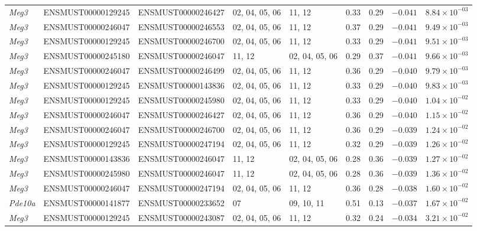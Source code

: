 \begin{landscape}
\begin{longtable}{@{} l l l p{2.8cm} p{2.8cm} r r r r @{}}
\textit{Meg3}   & ENSMUST00000129245 & ENSMUST00000246427 & 02, 04, 05, 06 & 11, 12 & 0.33 & 0.29 & $-0.041$ & $8.84 \times 10^{-03}$ \\
\textit{Meg3}   & ENSMUST00000246047 & ENSMUST00000246553 & 02, 04, 05, 06 & 11, 12 & 0.37 & 0.29 & $-0.041$ & $9.49 \times 10^{-03}$ \\
\textit{Meg3}   & ENSMUST00000129245 & ENSMUST00000246700 & 02, 04, 05, 06 & 11, 12 & 0.33 & 0.29 & $-0.041$ & $9.51 \times 10^{-03}$ \\
\textit{Meg3}   & ENSMUST00000245180 & ENSMUST00000246047 & 11, 12 & 02, 04, 05, 06 & 0.29 & 0.37 & $-0.041$ & $9.66 \times 10^{-03}$ \\
\textit{Meg3}   & ENSMUST00000246047 & ENSMUST00000246499 & 02, 04, 05, 06 & 11, 12 & 0.36 & 0.29 & $-0.040$ & $9.79 \times 10^{-03}$ \\
\textit{Meg3}   & ENSMUST00000129245 & ENSMUST00000143836 & 02, 04, 05, 06 & 11, 12 & 0.33 & 0.29 & $-0.040$ & $9.83 \times 10^{-03}$ \\
\textit{Meg3}   & ENSMUST00000129245 & ENSMUST00000245980 & 02, 04, 05, 06 & 11, 12 & 0.33 & 0.29 & $-0.040$ & $1.04 \times 10^{-02}$ \\
\textit{Meg3}   & ENSMUST00000246047 & ENSMUST00000246427 & 02, 04, 05, 06 & 11, 12 & 0.36 & 0.29 & $-0.040$ & $1.15 \times 10^{-02}$ \\
\textit{Meg3}   & ENSMUST00000246047 & ENSMUST00000246700 & 02, 04, 05, 06 & 11, 12 & 0.36 & 0.29 & $-0.039$ & $1.24 \times 10^{-02}$ \\
\textit{Meg3}   & ENSMUST00000129245 & ENSMUST00000247194 & 02, 04, 05, 06 & 11, 12 & 0.32 & 0.29 & $-0.039$ & $1.26 \times 10^{-02}$ \\
\textit{Meg3}   & ENSMUST00000143836 & ENSMUST00000246047 & 11, 12 & 02, 04, 05, 06 & 0.28 & 0.36 & $-0.039$ & $1.27 \times 10^{-02}$ \\
\textit{Meg3}   & ENSMUST00000245980 & ENSMUST00000246047 & 11, 12 & 02, 04, 05, 06 & 0.28 & 0.36 & $-0.039$ & $1.36 \times 10^{-02}$ \\
\textit{Meg3}   & ENSMUST00000246047 & ENSMUST00000247194 & 02, 04, 05, 06 & 11, 12 & 0.36 & 0.28 & $-0.038$ & $1.60 \times 10^{-02}$ \\
\textit{Pde10a} & ENSMUST00000141877 & ENSMUST00000233652 & 07 & 09, 10, 11 & 0.51 & 0.13 & $-0.037$ & $1.67 \times 10^{-02}$ \\
\textit{Meg3}   & ENSMUST00000129245 & ENSMUST00000243087 & 02, 04, 05, 06 & 11, 12 & 0.32 & 0.24 & $-0.034$ & $3.21 \times 10^{-02}$ \\

\end{longtable}
\end{landscape}
